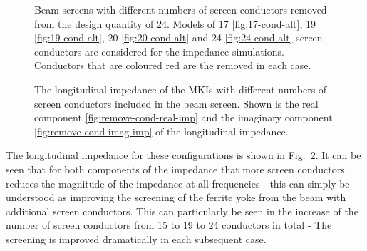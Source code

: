 \begin{figure}
{\label{fig:24-cond-alt}
}
\caption{Beam screens with different numbers of screen conductors removed from the design quantity of 24. Models of 17 \ref {fig:17-cond-alt}, 19 \ref{fig:19-cond-alt}, 20 \ref{fig:20-cond-alt} and 24 \ref{fig:24-cond-alt} screen conductors are considered for the impedance simulations. Conductors that are coloured red are the removed in each case.}
\label{fig:mki-take-away-cond-alt}
\end{figure}

\begin{figure}
\caption{The longitudinal impedance of the MKIs with different numbers of screen conductors included in the beam screen. Shown is the real component \ref{fig:remove-cond-real-imp} and the imaginary component \ref{fig:remove-cond-imag-imp} of the longitudinal impedance.}
\label{fig:remove-cond-impedance}
\end{figure}

The longitudinal impedance for these configurations is shown in Fig.~\ref{fig:remove-cond-impedance}. It can be seen that for both components of the impedance that more screen conductors reduces the magnitude of the impedance at all frequencies - this can simply be understood as improving the screening of the ferrite yoke from the beam with additional screen conductors. This can particularly be seen in the increase of the number of screen conductors from 15 to 19 to 24 conductors in total - The screening is improved dramatically in each subsequent case. 


